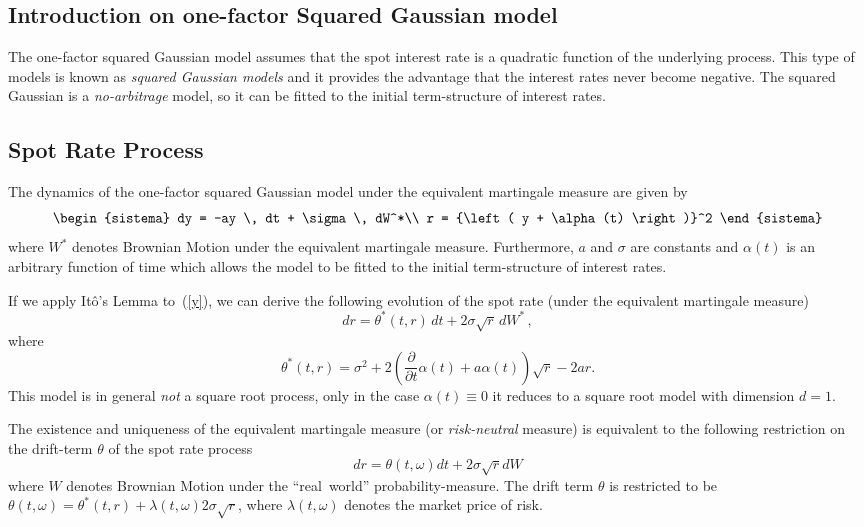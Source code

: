 \subsection{Introduction on one-factor Squared Gaussian model}
The one-factor squared Gaussian model assumes that the spot interest rate is a quadratic function of the underlying process. This type of models is known as \emph{squared Gaussian models} and it provides the advantage that the interest rates never become negative. The squared Gaussian is a \emph{no-arbitrage} model, so it can be fitted to the initial term-structure of interest rates.

\subsection{Spot Rate Process}
The dynamics of the one-factor squared Gaussian model under the equivalent martingale measure are given by
\begin{equation}
\label{y}
\begin{sistema}
dy = -ay \, dt + \sigma \, dW^*\\
r = {\left( y + \alpha(t) \right)}^2
\end{sistema}
\end{equation}
where $W^*$ denotes Brownian Motion under the equivalent martingale measure. Furthermore, $a$ and $\sigma$ are constants and $\alpha(t)$ is an arbitrary function of time which allows the model to be fitted to the initial term-structure of interest rates.

If we apply It\^o's Lemma to~(\ref{y}), we can derive the following evolution of the spot rate (under the equivalent martingale measure)
\begin{equation}
dr = \theta^{*}(t,r) \, dt + 2 \sigma \sqrt{r} \, dW^{*} \, ,
\end{equation}
where
\begin{equation}
\theta^{*}(t,r) = \sigma^2 +2 \left(\frac{\partial}{\partial t}\alpha(t) + a \alpha(t) \right)\sqrt{r} - 2 a r.
\end{equation}
This model is in general \emph{not} a square root process, only in the case $\alpha(t)\equiv0$ it reduces to a square root model with dimension $d=1$.


The existence and uniqueness of the equivalent martingale measure (or \emph{risk-neutral} measure) is equivalent to the following restriction on the drift-term $\theta$ of the spot rate process
\begin{equation}
 dr=\theta(t,\omega)dt+2\sigma \sqrt{r} dW
\end{equation}
where $W$ denotes Brownian Motion under the ``real~world'' probability-measure. The drift term $\theta$ is restricted to be $\theta(t,\omega) = \theta^*(t,r)+\lambda(t,\omega)2\sigma\sqrt{r}$, where $\lambda(t,\omega)$ denotes the market price of risk.

